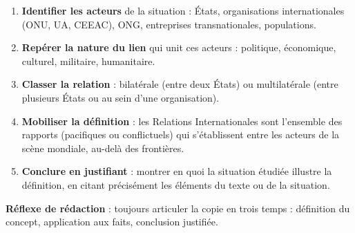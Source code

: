 \documentclass[11pt]{article}
\newcommand{\cle}[1]{{\popxbold\color{popdark}#1}}
\begin{document}
\begin{methode}
\begin{enumerate}
\item \textbf{Identifier les acteurs} de la situation : États, organisations internationales (ONU, UA, CEEAC), ONG, entreprises transnationales, populations.
\item \textbf{Repérer la nature du lien} qui unit ces acteurs : politique, économique, culturel, militaire, humanitaire.
\item \textbf{Classer la relation} : \cle{bilatérale} (entre deux États) ou \cle{multilatérale} (entre plusieurs États ou au sein d'une organisation).
\item \textbf{Mobiliser la définition} : les Relations Internationales sont l'ensemble des rapports (pacifiques ou conflictuels) qui s'établissent entre les acteurs de la scène mondiale, au-delà des frontières.
\item \textbf{Conclure en justifiant} : montrer en quoi la situation étudiée illustre la définition, en citant précisément les éléments du texte ou de la situation.
\end{enumerate}
\textbf{Réflexe de rédaction} : toujours articuler la copie en trois temps : définition du concept, application aux faits, conclusion justifiée.
\end{methode}
\end{document}
